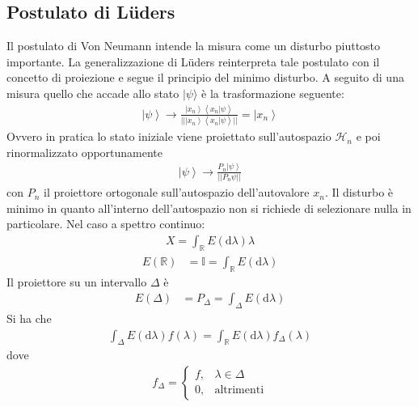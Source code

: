 \subsection{Postulato di Lüders} %
Il postulato di Von Neumann intende la misura come un disturbo piuttosto importante. La generalizzazione di Lüders reinterpreta tale postulato con il concetto di proiezione e segue il principio del minimo disturbo.
A seguito di una misura quello che accade allo stato $|\psi \rangle $ è la trasformazione seguente:
\begin{equation*}\begin{split}
\left |\psi  \right\rangle \rightarrow \frac{\left |x_n \right\rangle\left\langle x_n|\psi  \right\rangle}{||\left |x_n \right\rangle\left\langle x_n|\psi  \right\rangle||}=\left |x_n \right\rangle
\end{split}\end{equation*}
Ovvero in pratica lo stato iniziale viene proiettato sull'autospazio $\mathcal{H}_n$ e poi rinormalizzato opportunamente
\begin{equation*}\begin{split}
\left |\psi  \right\rangle \rightarrow \frac{P_n\left |\psi  \right\rangle}{||P_n\psi ||}
\end{split}\end{equation*}
con $P_n$ il proiettore ortogonale sull'autospazio dell'autovalore $x_n$. Il disturbo è minimo in quanto all'interno dell'autospazio non si richiede di selezionare nulla in particolare.
Nel caso a spettro continuo:
\begin{equation*}\begin{split}
X=\int_{\mathbb{R} }{E\left(\textrm{d}\lambda\right)\lambda}
\end{split}\end{equation*}
\begin{equation*}\begin{split}
E\left(\mathbb{R} \right)&=\mathbb{I}=\int_{\mathbb{R} }{E\left(\textrm{d}\lambda\right)}
\end{split}\end{equation*}
Il proiettore su un intervallo $\Delta$ è
\begin{equation*}\begin{split}
E\left(\Delta\right)&=P_{\Delta}=\int_{\Delta}{E\left(\textrm{d}\lambda\right)}
\end{split}\end{equation*}
Si ha che
\begin{equation*}\begin{split}
\int_{\Delta}{E\left(\textrm{d}\lambda\right)f\left(\lambda\right)}=\int_{\mathbb{R} }{E\left(\textrm{d}\lambda\right)f_\Delta\left(\lambda\right)}
\end{split}\end{equation*}
dove
\begin{equation*}\begin{split}f_\Delta=
\begin{cases}
f, & \lambda\in\Delta \\
0, & \textrm{altrimenti}
\end{cases}
\end{split}\end{equation*}

